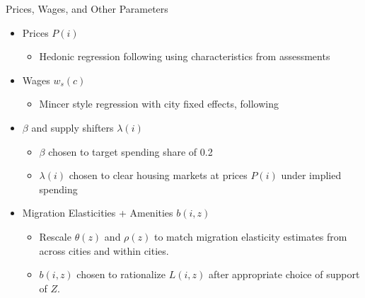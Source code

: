 \documentclass{beamer}
\begin{document}
\begin{frame}{Prices, Wages, and Other Parameters}
	\begin{itemize}
		\color{black}
		\item Prices $P(i)$ 
		\begin{itemize}
			\item Hedonic regression following \cite{BSH} using characteristics from assessments
		\end{itemize}\pause
		
		\item Wages $w_{s}(c)$
		\begin{itemize}
			\item Mincer style regression with city fixed effects, following \cite{ineqincreased}
		\end{itemize} \pause
		 
		\item $\beta$ and supply shifters $\lambda(i)$
		\begin{itemize}
			\item $\beta$ chosen to target spending share of 0.2 \citep{orlatomagnedavis}
			\item $\lambda(i)$ chosen to clear housing markets at prices $P(i)$ under implied spending
		\end{itemize} \pause
	\item Migration Elasticities + Amenities $b(i, z)$
	\begin{itemize}
		\item Rescale $\theta(z)$ and $\rho(z)$ to match migration elasticity estimates from \cite{morettihornbeck} across cities and \cite{herzog2022} within cities. \pause
		
		\item $b(i, z)$ chosen to rationalize $L(i, z)$ after appropriate choice of support of $Z$. 
	\end{itemize}
	\end{itemize}
\end{frame}
\end{document}
